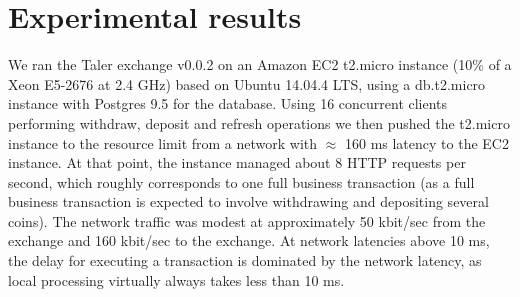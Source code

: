 \documentclass{llncs}
\begin{document}
\section{Experimental results}


We ran the Taler exchange v0.0.2 on an Amazon EC2 t2.micro instance
(10\% of a Xeon E5-2676 at 2.4 GHz) based on Ubuntu 14.04.4 LTS, using
a db.t2.micro instance with Postgres 9.5 for the database.  Using 16
concurrent clients performing withdraw, deposit and refresh operations
we then pushed the t2.micro instance to the resource limit
from a network with $\approx$ 160 ms latency to
the EC2 instance.  At that point, the instance managed about 8 HTTP
requests per second, which roughly corresponds to one full business
transaction (as a full business transaction is expected to involve
withdrawing and depositing several coins).  The network traffic was
modest at approximately 50 kbit/sec from the exchange
and 160 kbit/sec to the exchange.
At network latencies above 10 ms, the delay
for executing a transaction is dominated by the network latency, as
local processing virtually always takes less than 10 ms.
\end{document}
